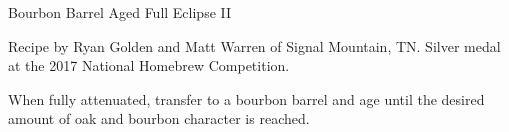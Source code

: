 \stylesection{\styleimperialstout}

\begin{recipe}{Bourbon Barrel Aged Full Eclipse II}

\begin{aboutblock}
Recipe by Ryan Golden and Matt Warren of Signal Mountain, TN. Silver medal
at the 2017 National Homebrew Competition. \sourceaha
\end{aboutblock}


\begin{methodandtiming}
 
\begin{mashsteps}
\end{mashsteps}

\begin{fermentationsteps}
\end{fermentationsteps}

\begin{directions}
When fully attenuated, transfer to a bourbon barrel and age until the desired
amount of oak and bourbon character is reached.
\end{directions}

\end{methodandtiming}

\recipebreak

\begin{ingredientsblock}

\begin{malts}
\end{malts}

\begin{hops}

\end{hops}


\end{ingredientsblock}

\end{recipe}

